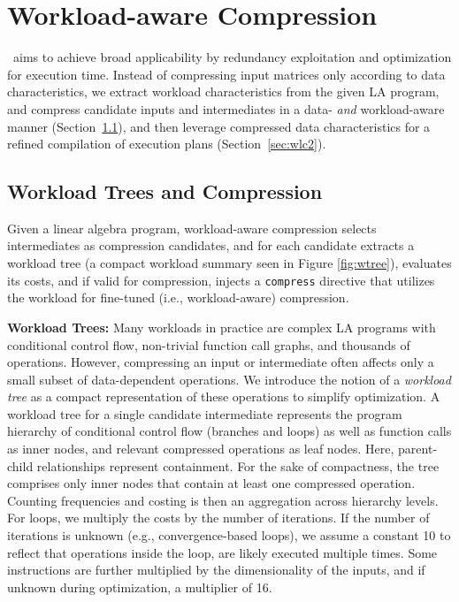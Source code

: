 \section{Workload-aware Compression}
\label{sec:workload}

\name\ aims to achieve broad applicability by redundancy exploitation and optimization for execution time.
Instead of compressing input matrices only according to data characteristics, we extract workload characteristics from the given LA program,
and compress candidate inputs and intermediates in a data- \emph{and} workload-aware manner (Section~\ref{sec:wlc1}),
and then leverage compressed data characteristics for a refined compilation of execution plans (Section~\ref{sec:wlc2}).

\subsection{Workload Trees and Compression}
\label{sec:wlc1}

Given a linear algebra program, workload-aware compression selects intermediates as compression candidates,
and for each candidate extracts a workload tree (a compact workload summary seen in Figure \ref{fig:wtree}),
evaluates its costs, and if valid for compression, injects a \texttt{compress} directive that utilizes the workload for fine-tuned (i.e., workload-aware) compression.

\textbf{Workload Trees:}
Many workloads in practice are complex LA programs with conditional control flow,
non-trivial function call graphs, and thousands of operations.
However, compressing an input or intermediate often affects only a small subset of data-dependent operations.
We introduce the notion of a \emph{workload tree} as a compact representation of these operations to simplify optimization.
A workload tree for a single candidate intermediate represents the program hierarchy of conditional control flow (branches and loops) as well as function calls as inner nodes,
and relevant compressed operations as leaf nodes.
Here, parent-child relationships represent containment.
For the sake of compactness, the tree comprises only inner nodes that contain at least one compressed operation.
Counting frequencies and costing is then an aggregation across hierarchy levels.
For loops, we multiply the costs by the number of iterations.
If the number of iterations is unknown (e.g., convergence-based loops),
we assume a constant 10 to reflect that operations inside the loop, are likely executed multiple times.
Some instructions are further multiplied by the dimensionality of the inputs, and if unknown during optimization, a multiplier of 16.

